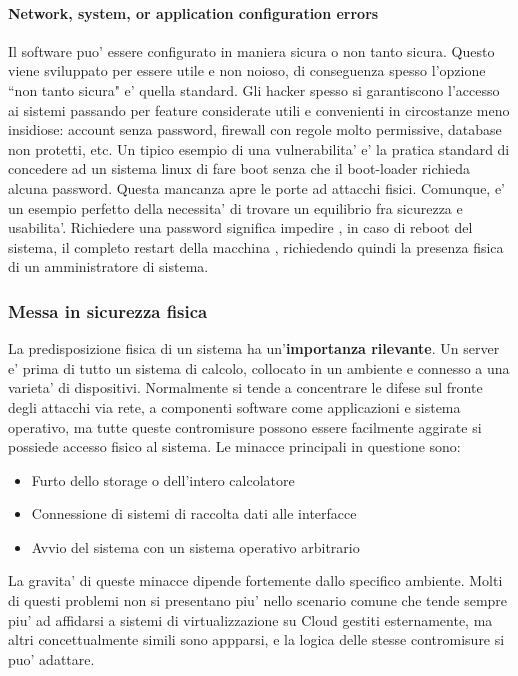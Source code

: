 \paragraph{Network, system, or application configuration errors}
Il software puo' essere configurato in maniera sicura o non tanto sicura. Questo viene sviluppato per essere utile e non noioso, di conseguenza spesso l'opzione ``non tanto sicura" e' quella standard. Gli hacker spesso si garantiscono l'accesso ai sistemi passando per feature considerate utili e convenienti in circostanze meno insidiose: account senza password, firewall con regole molto permissive, database non protetti, etc. Un tipico esempio di una vulnerabilita' e' la pratica standard di concedere ad un sistema linux di fare boot senza che il boot-loader richieda alcuna password. Questa mancanza apre le porte ad attacchi fisici. Comunque, e' un esempio perfetto della necessita' di trovare un equilibrio fra sicurezza e usabilita'. Richiedere una password significa impedire , in caso di reboot del sistema, il completo restart della macchina , richiedendo quindi la presenza fisica di un amministratore di sistema.

\subsubsection{Messa in sicurezza fisica}
La predisposizione fisica di un sistema ha un'\textbf{importanza rilevante}. Un server e' prima di tutto un sistema di calcolo, collocato in un ambiente e connesso a una varieta' di dispositivi. Normalmente si tende a concentrare le difese sul fronte degli attacchi via rete, a componenti software come applicazioni e sistema operativo, ma tutte queste contromisure possono essere facilmente aggirate si possiede accesso fisico al sistema. Le minacce principali in questione sono:
\begin{itemize}
	\item Furto dello storage o dell'intero calcolatore
	\item Connessione di sistemi di raccolta dati alle interfacce
	\item Avvio del sistema con un sistema operativo arbitrario
\end{itemize}
La gravita' di queste minacce dipende fortemente dallo specifico ambiente. Molti di questi problemi non si presentano piu' nello scenario comune che tende sempre piu' ad affidarsi a sistemi di virtualizzazione su Cloud gestiti esternamente, ma altri concettualmente simili sono appparsi, e la logica delle stesse contromisure si puo' adattare.
		
